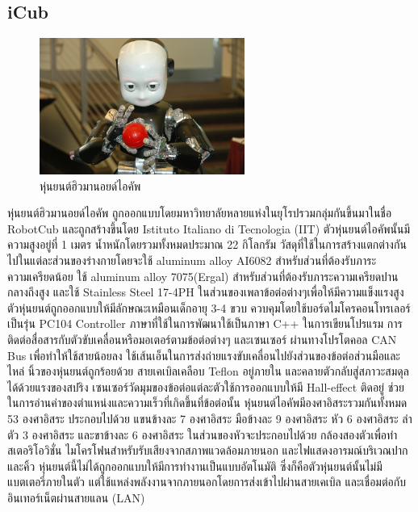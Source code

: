 \subsection*{iCub}
\begin{figure}[htbp]
    \centering
    \includegraphics[width=0.6\textwidth]{chapter2/images/icub-1.jpg}
    \caption{หุ่นยนต์ฮิวมานอยด์ไอคัพ}
    \label{fig:icub_humanoid}
\end{figure}
\hspace*{10mm} หุ่นยนต์ฮิวมานอยด์ไอคัพ ถูกออกแบบโดยมหาวิทยาลัยหลายแห่งในยุโรปรวมกลุ่มกันขึ้นมาในชื่อ RobotCub
และถูกสร้างขึ้นโดย Istituto Italiano di Tecnologia (IIT) ตัวหุ่นยนต์ไอคัพนั้นมีความสูงอยู่ที่ 1 เมตร
น้ำหนักโดยรวมทั้งหมดประมาณ 22 กิโลกรัม วัสดุที่ใช้ในการสร้างแตกต่างกันไปในแต่ละส่วนของร่างกายโดยจะใช้
aluminum alloy AI6082 สำหรับส่วนที่ต้องรับภาระความเครียดน้อย ใช้ aluminum alloy 7075(Ergal) สำหรับส่วนที่ต้องรับภาระความเครียดปานกลางถึงสูง
และใช้ Stainless Steel 17-4PH ในส่วนของเพลาข้อต่อต่างๆเพื่อให้มีความแข็งแรงสูง ตัวหุ่นยนต์ถูกออกแบบให้มีลักษณะเหมือนเด็กอายุ 3-4 ขวบ
ควบคุมโดยใช้บอร์ดไมโครคอนโทรเลอร์เป็นรุ่น PC104 Controller ภาษาที่ใช้ในการพัฒนาใช้เป็นภาษา C++ ในการเขียนโปรแรม
การติดต่อสื่อสารกับตัวขับเคลื่อนหรือมอเตอร์ตามข้อต่อต่างๆ และเซนเซอร์ ผ่านทางโปรโตคอล CAN Bus เพื่อทำให้ใช้สายน้อยลง
ใช้เส้นเอ็นในการส่งถ่ายแรงขับเคลื่อนไปยังส่วนของข้อต่อส่วนมือและไหล่ นิ้วของหุ่นยนต์ถูกร้อยด้วย สายเคเบิลเคลือบ Teflon อยู่ภายใน
และคลายตัวกลับสู่สภาวะสมดุลได้ด้วยแรงของสปริง เซนเซอร์วัดมุมของข้อต่อแต่ละตัวใช้การออกแบบให้มี Hall-effect ติดอยู่
ช่วยในการอ่านค่าของตำแหน่งและความเร็วที่เกิดขึ้นที่ข้อต่อนั้น หุ่นยนต์ไอคัพมีองศาอิสระรวมกันทั้งหมด 53 องศาอิสระ
ประกอบไปด้วย แขนข้างละ 7 องศาอิสระ มือข้างละ 9 องศาอิสระ หัว 6 องศาอิสระ ลำตัว 3 องศาอิสระ และขาข้างละ 6 องศาอิสระ
ในส่วนของหัวจะประกอบไปด้วย กล้องสองตัวเพื่อทำสเตอริโอวิชั่น ไมโครโฟนสำหรับรับเสียงจากสภาพแวดล้อมภายนอก
และไฟแสดงอารมณ์บริเวณปากและคิ้ว หุ่นยนต์นี้ไม่ได้ถูกออกแบบให้มีการทำงานเป็นแบบอัตโนมัติ ซึ่งก็คือตัวหุ่นยนต์นั้นไม่มีแบตเตอรี่ภายในตัว
แต่ใช้แหล่งพลังงานจากภายนอกโดยการส่งเข้าไปผ่านสายเคเบิล และเชื่อมต่อกับอินเทอร์เน็ตผ่านสายแลน (LAN)

